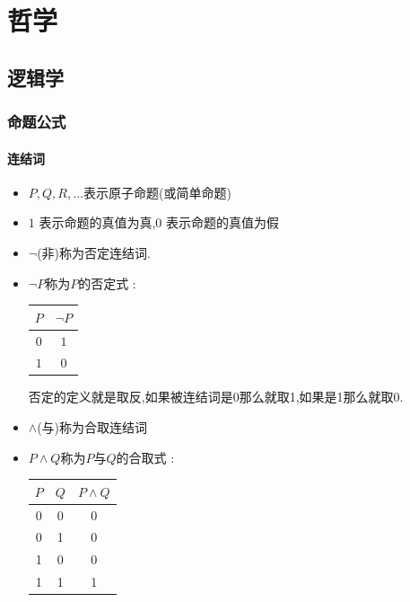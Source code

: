 \documentclass[UTF8,12pt]{ctexbook}
\begin{document}
{{{   }%

 }%

\chapter{哲学}{

\section{逻辑学}{

\subsection{命题公式}{

  \subsubsection{连结词}{

    \begin{itemize}
      \item $P,Q,R,...$表示原子命题(或简单命题)
      \item $1$ 表示命题的真值为真,$0$ 表示命题的真值为假
      \item $\lnot$(非)称为否定连结词.
      \item {
            $\lnot P$称为$P$的否定式 :

            \begin{center}
              \begin{tabular}{c|c}
                \hline
                $P$ & $\lnot P$ \\
                \hline
                $0$ & $1$       \\
                $1$ & $0$       \\
                \hline
              \end{tabular}
            \end{center}

            否定的定义就是取反,如果被连结词是0那么就取1,如果是1那么就取0.
            }
      \item $\land$(与)称为合取连结词
      \item {
            $P \land Q$称为$P$与$Q$的合取式 :

            \begin{center}
              \begin{tabular}{c|c|c}
                \hline
                $P$ & $Q$ & $P \land Q$ \\
                \hline
                0   & 0   & 0           \\
                0   & 1   & 0           \\
                1   & 0   & 0           \\
                1   & 1   & 1           \\
                \hline
              \end{tabular}
            \end{center}

}
\end{itemize}}}}}}
\end{document}
